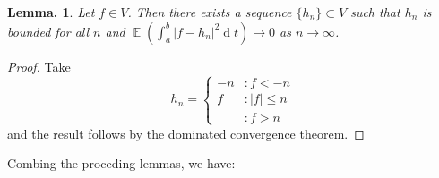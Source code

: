 \documentclass[11pt, a4paper]{memoir}
\theoremstyle{change}
\newtheorem{lemma}[theorem]{Lemma.}
\theoremstyle{plain}
\theoremstyle{nonumberplain}
\newtheorem{proof}{Proof}
\DeclareMathOperator{\E}{{\mathbb{E}}}
\renewcommand{\d}[1]{\ensuremath{\operatorname{d}\!{#1}}}
\numberwithin{equation}{section}
\begin{document}
\begin{lemma}
    Let $f\in V$.
    Then there exists a sequence $\{h_n\}\subset V$ such that $h_n$ is bounded for all $n$ and $\E(\int_a^b|f-h_n|^2\d{t})\to 0$ as $n\to\infty$.
\end{lemma}
\begin{proof}
    Take
    \begin{equation*}
        h_n =
        \begin{cases}
            -n &: f<-n\\
            f &: |f|\leq n\\
             &: f>n
        \end{cases}
    \end{equation*}
    and the result follows by the dominated convergence theorem.
\end{proof}
Combing the proceding lemmas, we have:
\end{document}
